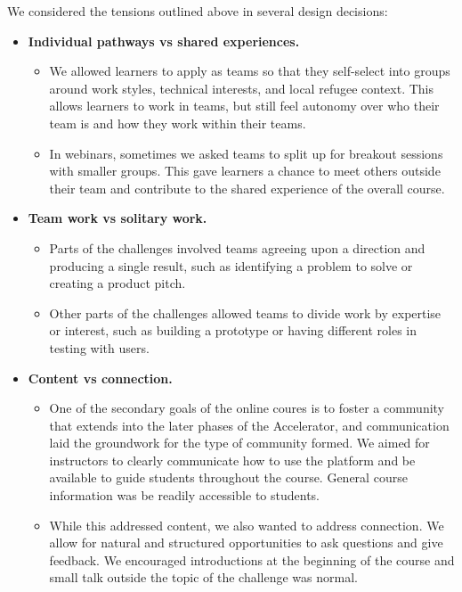 \documentclass[12pt,twoside,vi]{mitthesis}
\newcommand{\draft}[1]{{\color{blue} #1}}
\begin{document}
\draft{We considered the tensions outlined above in several design decisions:

\begin{itemize}
\item \textbf{Individual pathways vs shared experiences.}
\begin{itemize}
	\item We allowed learners to apply as teams so that they self-select into groups around work styles, technical interests, and local refugee context. This allows learners to work in teams, but still feel autonomy over who their team is and how they work within their teams.
	\item In webinars, sometimes we asked teams to split up for breakout sessions with smaller groups. This gave learners a chance to meet others outside their team and contribute to the shared experience of the overall course.
\end{itemize}
\item \textbf{Team work vs solitary work.}
\begin{itemize}
	\item Parts of the challenges involved teams agreeing upon a direction and producing a single result, such as identifying a problem to solve or creating a product pitch.
	\item Other parts of the challenges allowed teams to divide work by expertise or interest, such as building a prototype or having different roles in testing with users.
\end{itemize}
\item \textbf{Content vs connection.} 
\begin{itemize}
	\item One of the secondary goals of the online coures is to foster a community that extends into the later phases of the Accelerator, and communication laid the groundwork for the type of community formed. We aimed for instructors to clearly communicate how to use the platform and be available to guide students throughout the course. General course information was be readily accessible to students.
	\item While this addressed content, we also wanted to address connection. We allow for natural and structured opportunities to ask questions and give feedback. We encouraged introductions at the beginning of the course and small talk outside the topic of the challenge was normal.
\end{itemize}
\end{itemize}

}
\end{document}
